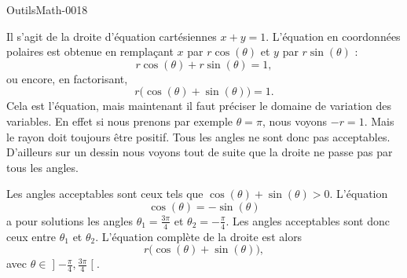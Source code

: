 
\begin{corrige}{OutilsMath-0018}

	Il s'agit de la droite d'équation cartésiennes $x+y=1$. L'équation en coordonnées polaires est obtenue en remplaçant $x$ par $r\cos(\theta)$ et $y$ par $r\sin(\theta)$ :
	\begin{equation}
		r\cos(\theta)+r\sin(\theta)=1,
	\end{equation}
	ou encore, en factorisant, 
	\begin{equation}
		r\big( \cos(\theta)+\sin(\theta) \big)=1.
	\end{equation}
	Cela est l'équation, mais maintenant il faut préciser le domaine de variation des variables. En effet si nous prenons par exemple $\theta=\pi$, nous voyons $-r=1$. Mais le rayon doit toujours être positif. Tous les angles ne sont donc pas acceptables. D'ailleurs sur un dessin nous voyons tout de suite que la droite ne passe pas par tous les angles.

	Les angles acceptables sont ceux tels que $\cos(\theta)+\sin(\theta)> 0$. L'équation
	\begin{equation}
		\cos(\theta)=-\sin(\theta)
	\end{equation}
	a pour solutions les angles $\theta_1=\frac{ 3\pi }{ 4 }$ et $\theta_2=-\frac{ \pi }{ 4 }$. Les angles acceptables sont donc ceux entre $\theta_1$ et $\theta_2$. L'équation complète de la droite est alors
	\begin{equation}
		r\big( \cos(\theta)+\sin(\theta) \big),
	\end{equation}
	avec $\theta\in\mathopen] -\frac{ \pi }{ 4 } , \frac{ 3\pi }{ 4 } \mathclose[$.

\end{corrige}
